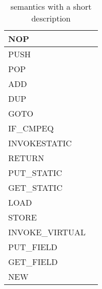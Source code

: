 \section{\jcl}
\begin{table}[]
\centering
\label{tab:instr}
\begin{tabular}{l|l}
\hline
NOP             &   \\ \hline
PUSH            &   \\ \hline
POP             &   \\ \hline
ADD             &   \\ \hline
DUP             &   \\ \hline
GOTO            &   \\ \hline
IF\_CMPEQ       &   \\ \hline
INVOKESTATIC    &   \\ \hline
RETURN          &   \\ \hline
PUT\_STATIC     &   \\ \hline
GET\_STATIC     &   \\ \hline
LOAD            &   \\ \hline
STORE           &   \\ \hline
INVOKE\_VIRTUAL &   \\ \hline
PUT\_FIELD      &   \\ \hline
GET\_FIELD      &   \\ \hline
NEW             &   \\ \hline  
\end{tabular}
\caption{\jcl semantics with a short description}
\end{table}